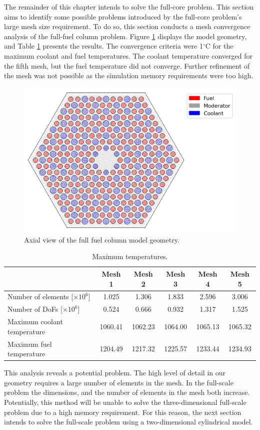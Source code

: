 The remainder of this chapter intends to solve the full-core problem.
This section aims to identify some possible problems introduced by the full-core problem's large mesh size requirement.
To do so, this section conducts a mesh convergence analysis of the full-fuel column problem.
Figure \ref{fig:th-full-assem-mesh} displays the model geometry, and Table \ref{tab:th-full-assem-results} presents the results.
The convergence criteria were 1$^{\circ}$C for the maximum coolant and fuel temperatures.
The coolant temperature converged for the fifth mesh, but the fuel temperature did not converge.
Further refinement of the mesh was not possible as the simulation memory requirements were too high.

\begin{figure}[htbp!]
  \centering
  \includegraphics[width=0.45\linewidth]{figures-thermal/full-assem-mesh2}
  \hfill
  \caption{Axial view of the full fuel column model geometry.}
  \label{fig:th-full-assem-mesh}
\end{figure}

\begin{table}[htbp!]
  \centering
  \caption{Maximum temperatures.}
  \label{tab:th-full-assem-results}
\begin{tabular}{lccccc}
\toprule
                            & Mesh 1 & Mesh 2 & Mesh 3 & Mesh 4 & Mesh 5 \\
\midrule
Number of elements [$\times 10^{6}$]  & 1.025 & 1.306 & 1.833 & 2.596 & 3.006 \\
Number of DoFs [$\times 10^{6}$]      & 0.524 & 0.666 & 0.932 & 1.317 & 1.525 \\
Maximum coolant temperature & 1060.41 & 1062.23 & 1064.00 & 1065.13 & 1065.32 \\
Maximum fuel temperature    & 1204.49 & 1217.32 & 1225.57 & 1233.44 & 1234.93 \\
\bottomrule
\end{tabular}
\end{table}

This analysis reveals a potential problem.
The high level of detail in our geometry requires a large number of elements in the mesh.
In the full-scale problem the dimensions, and the number of elements in the mesh both increase.
Potentially, this method will be unable to solve the three-dimensional full-scale problem due to a high memory requirement.
For this reason, the next section intends to solve the full-scale problem using a two-dimensional cylindrical model.

